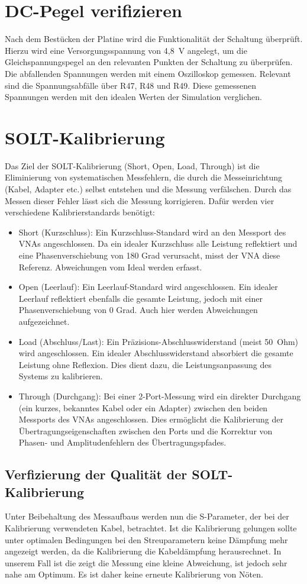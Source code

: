 \section{DC-Pegel verifizieren}
Nach dem Bestücken der Platine wird die Funktionalität der Schaltung überprüft. Hierzu wird eine Versorgungsspannung von 4,8~V angelegt, um die Gleichspannungspegel an den relevanten Punkten der Schaltung zu überprüfen. Die abfallenden Spannungen werden mit einem Oszilloskop gemessen. Relevant sind die Spannungsabfälle über R47, R48 und R49. Diese gemessenen Spannungen werden mit den idealen Werten der Simulation verglichen.
\clearpage
\section{SOLT-Kalibrierung}
Das Ziel der SOLT-Kalibrierung (Short, Open, Load, Through) ist die Eliminierung von systematischen Messfehlern, die durch die Messeinrichtung (Kabel, Adapter etc.) selbst entstehen und die Messung verfälschen.
Durch das Messen dieser Fehler lässt sich die Messung korrigieren.
Dafür werden vier verschiedene Kalibrierstandards benötigt:
\begin{itemize}
    \item Short (Kurzschluss): Ein Kurzschluss-Standard wird an den Messport des VNAs angeschlossen. Da ein idealer Kurzschluss alle Leistung reflektiert und eine Phasenverschiebung von 180 Grad verursacht, misst der VNA diese Referenz. Abweichungen vom Ideal werden erfasst.
    \item Open (Leerlauf): Ein Leerlauf-Standard wird angeschlossen. Ein idealer Leerlauf reflektiert ebenfalls die gesamte Leistung, jedoch mit einer Phasenverschiebung von 0 Grad. Auch hier werden Abweichungen aufgezeichnet.
    \item Load (Abschluss/Last): Ein Präzisions-Abschlusswiderstand (meist 50~Ohm) wird angeschlossen. Ein idealer Abschlusswiderstand absorbiert die gesamte Leistung ohne Reflexion. Dies dient dazu, die Leistungsanpassung des Systems zu kalibrieren.
    \item Through (Durchgang): Bei einer 2-Port-Messung wird ein direkter Durchgang (ein kurzes, bekanntes Kabel oder ein Adapter) zwischen den beiden Messports des VNAs angeschlossen. Dies ermöglicht die Kalibrierung der Übertragungseigenschaften zwischen den Ports und die Korrektur von Phasen- und Amplitudenfehlern des Übertragungspfades.
\end{itemize}
\subsection{Verfizierung der Qualität der SOLT-Kalibrierung}
Unter Beibehaltung des Messaufbaus werden nun die S-Parameter, der bei der Kalibrierung verwendeten Kabel, betrachtet. Ist die Kalibrierung gelungen sollte unter optimalen Bedingungen bei den Streuparametern keine Dämpfung mehr angezeigt werden, da die Kalibrierung die Kabeldämpfung herausrechnet. In unserem Fall ist die zeigt die Messung eine kleine Abweichung, ist jedoch sehr nahe am Optimum. Es ist daher keine erneute Kalibrierung von Nöten.

